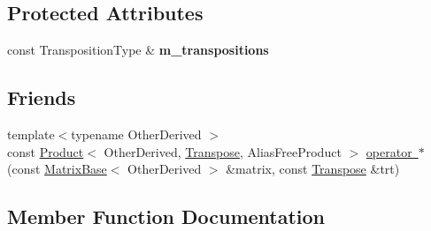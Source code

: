 \subsection*{Protected Attributes}
\begin{DoxyCompactItemize}
\item 
\mbox{\label{class_eigen_1_1_transpose_3_01_transpositions_base_3_01_transpositions_derived_01_4_01_4_a84eda9085d2aa8c4334dccc790f1afc9}} 
const Transposition\+Type \& {\bfseries m\+\_\+transpositions}
\end{DoxyCompactItemize}
\subsection*{Friends}
\begin{DoxyCompactItemize}
\item 
{\footnotesize template$<$typename Other\+Derived $>$ }\\const \mbox{\hyperlink{class_eigen_1_1_product}{Product}}$<$ Other\+Derived, \mbox{\hyperlink{class_eigen_1_1_transpose}{Transpose}}, Alias\+Free\+Product $>$ \mbox{\hyperlink{class_eigen_1_1_transpose_3_01_transpositions_base_3_01_transpositions_derived_01_4_01_4_abad977a8ed63d154defc69a8b49015f1}{operator $\ast$}} (const \mbox{\hyperlink{class_eigen_1_1_matrix_base}{Matrix\+Base}}$<$ Other\+Derived $>$ \&matrix, const \mbox{\hyperlink{class_eigen_1_1_transpose}{Transpose}} \&trt)
\end{DoxyCompactItemize}


\subsection{Member Function Documentation}
\mbox{\label{class_eigen_1_1_transpose_3_01_transpositions_base_3_01_transpositions_derived_01_4_01_4_a812f9c34b587a81b57b088d9828312db}} 
